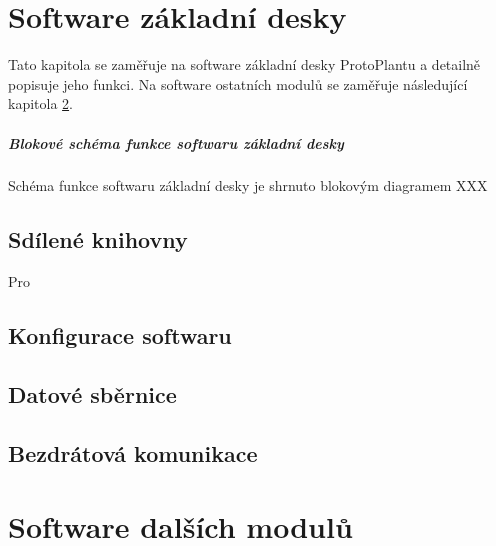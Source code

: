 \chapter{Software základní desky}
Tato kapitola se zaměřuje na software základní desky ProtoPlantu a detailně popisuje jeho funkci.
Na software ostatních modulů se zaměřuje následující kapitola \ref{chap:moduleSoftware}.

\paragraph{Blokové schéma funkce softwaru základní desky}
Schéma funkce softwaru základní desky je shrnuto blokovým diagramem XXX

\section{Sdílené knihovny}
Pro 

\section{Konfigurace softwaru}

\section{Datové sběrnice}

\section{Bezdrátová komunikace}


\chapter{Software dalších modulů}
\label{chap:moduleSoftware}

\newpage